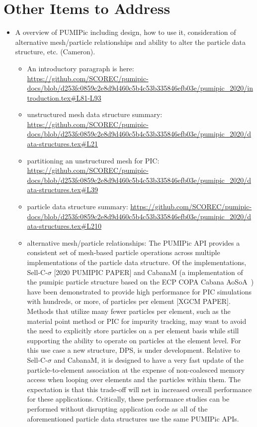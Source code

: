 \documentclass[12pt]{article}
\begin{document}
\section{Other Items to Address}
\begin{itemize}
    \item A overview of PUMIPic including design, how to use it, consideration of alternative mesh/particle relationships and ability to alter the particle data structure, etc. (Cameron).
    \begin{itemize}
      \item An introductory paragraph is here: \url{https://github.com/SCOREC/pumipic-docs/blob/d253fc0859c2e8d9d460c5b4c53b335846efb03e/pumipic_2020/introduction.tex#L81-L93}
      \item unstructured mesh data structure summary: \url{https://github.com/SCOREC/pumipic-docs/blob/d253fc0859c2e8d9d460c5b4c53b335846efb03e/pumipic_2020/data-structures.tex#L21}
      \item partitioning an unstructured mesh for PIC: \url{https://github.com/SCOREC/pumipic-docs/blob/d253fc0859c2e8d9d460c5b4c53b335846efb03e/pumipic_2020/data-structures.tex#L39}
      \item particle data structure summary: \url{https://github.com/SCOREC/pumipic-docs/blob/d253fc0859c2e8d9d460c5b4c53b335846efb03e/pumipic_2020/data-structures.tex#L210}
      \item alternative mesh/particle relationships: The PUMIPic API provides a consistent set of mesh-based particle operations across multiple implementations of the particle data structure.  Of the implementations, Sell-C-$\sigma$ [2020 PUMIPIC PAPER] and CabanaM (a implementation of the pumipic particle structure based on the ECP COPA Cabana AoSoA~\cite{Slattery2022}) have been demonstrated to provide high performance for PIC simulations with hundreds, or more, of particles per element [XGCM PAPER].  Methods that utilize many fewer particles per element, such as the material point method or PIC for impurity tracking, may want to avoid the need to explicitly store particles on a per element basis while still supporting the ability to operate on particles at the element level.  For this use case a new structure, DPS, is under development. Relative to Sell-C-$\sigma$ and CabanaM, it is designed to have a very fast update of the particle-to-element association at the expense of non-coalesced memory access when looping over elements and the particles within them. The expectation is that this trade-off will net in increased overall performance for these applications.  Critically, these performance studies can be performed without disrupting application code as all of the aforementioned particle data structures use the same PUMIPic APIs.

\end{itemize}
\end{itemize}
\end{document}

